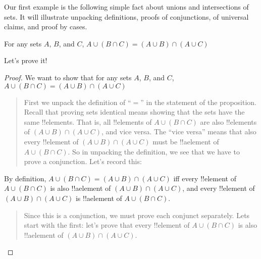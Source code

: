 \documentclass[../../../include/open-logic-section]{subfiles}
\begin{document}


Our first example is the following simple fact about unions and
intersections of sets.  It will illustrate unpacking definitions,
proofs of conjunctions, of universal claims, and proof by cases.

\begin{prop}
For any sets $A$, $B$, and $C$, $A \cup (B \cap C) = (A \cup B)
\cap (A \cup C)$
\end{prop}

Let's prove it!{}

\begin{proof}
We want to show that for any sets $A$, $B$, and $C$, $A \cup (B \cap
C) = (A \cup B) \cap (A \cup C)$
\begin{quote}
First we unpack the definition of ``$=$'' in the statement of the
proposition. Recall that proving sets identical means showing that the
sets have the same !!{element}s. That is, all !!{element}s of $A \cup
(B \cap C)$ are also !!{element}s of $(A \cup B) \cap (A \cup C)$, and
vice versa.  The ``vice versa'' means that also every !!{element} of $(A
\cup B) \cap (A \cup C)$ must be !!a{element} of $A \cup (B \cap
C)$.  So in unpacking the definition, we see that we have to prove a
conjunction.  Let's record this:
\end{quote}
By definition, $A \cup (B \cap C) = (A \cup B) \cap (A \cup C)$ iff
every !!{element} of $A \cup (B \cap C)$ is also !!a{element} of $(A
\cup B) \cap (A \cup C)$, and every !!{element} of $(A \cup B) \cap (A
\cup C)$ is !!a{element} of $A \cup (B \cap C)$.
\begin{quote}
Since this is a conjunction, we must prove each conjunct
separately. Lets start with the first: let's prove that every
!!{element} of $A \cup (B \cap C)$ is also !!a{element} of $(A
\cup B) \cap (A \cup C)$.


\end{quote}
\end{proof}
\end{document}
